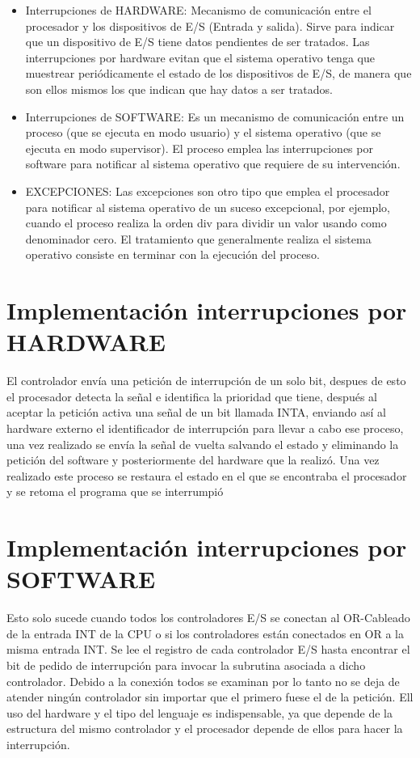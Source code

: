 \documentclass{article}
\begin{document}
\begin{itemize}
\item Interrupciones de HARDWARE: Mecanismo de comunicación entre el procesador y los dispositivos de E/S (Entrada y salida). Sirve para indicar que un dispositivo de E/S tiene datos pendientes de ser tratados. Las interrupciones por hardware evitan que el sistema operativo tenga que muestrear periódicamente el estado de los dispositivos de E/S, de manera que son ellos mismos los que indican que hay datos a ser tratados.
\item Interrupciones de SOFTWARE: Es un mecanismo de comunicación entre un proceso (que se ejecuta en modo usuario) y el sistema operativo (que se ejecuta en modo supervisor). El proceso emplea las interrupciones por software para notificar al sistema operativo que requiere de su intervención.
\item EXCEPCIONES: Las excepciones son otro tipo que emplea el procesador para notificar al sistema operativo de un suceso excepcional, por ejemplo, cuando el proceso realiza la orden div para dividir un valor usando como denominador cero. El tratamiento que generalmente realiza el sistema operativo consiste en terminar con la ejecución del proceso.
\end{itemize}

\section{Implementación interrupciones por HARDWARE}
El controlador envía una petición de interrupción de un solo bit, despues de esto el procesador detecta la señal e identifica la prioridad que tiene, después al aceptar la petición activa una señal de un bit llamada INTA, enviando así al hardware externo el identificador de interrupción para llevar a cabo ese proceso, una vez realizado se envía la señal de vuelta salvando el estado y eliminando la petición del software y posteriormente del hardware que la realizó. Una vez realizado este proceso se restaura el estado en el que se encontraba el procesador y se retoma el programa que se interrumpió
\\[0.5cm]

\section{Implementación interrupciones por SOFTWARE}
Esto solo sucede cuando todos los controladores E/S se conectan al OR-Cableado de la entrada INT de la CPU o si los controladores están conectados en OR a la misma entrada INT. Se lee el registro de cada controlador E/S hasta encontrar el bit de pedido de interrupción para invocar la subrutina asociada a dicho controlador. Debido a la conexión todos se examinan por lo tanto no se deja de atender ningún controlador sin importar que el primero fuese el de la petición. Ell uso del hardware y el tipo del lenguaje es indispensable, ya que depende de la estructura del mismo controlador y el procesador depende de ellos para hacer la interrupción.
\\[0.5cm]
\end{document}
